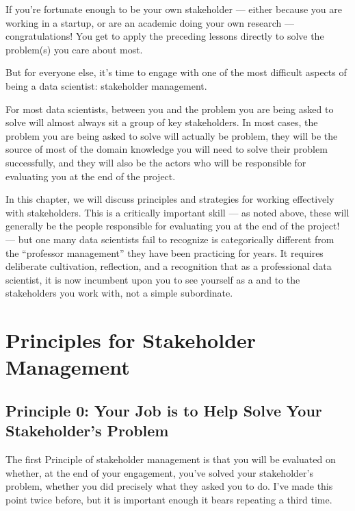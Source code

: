 \documentclass[letterpaper,10pt,english]{jupyterBook}
\begin{document}
\sphinxAtStartPar
If you’re fortunate enough to be your own stakeholder — either because you are working in a startup, or are an academic doing your own research — congratulations! You get to apply the preceding lessons directly to solve the problem(s) you care about most.

\sphinxAtStartPar
But for everyone else, it’s time to engage with one of the most difficult aspects of being a data scientist: stakeholder management.

\sphinxAtStartPar
For most data scientists, between you and the problem you are being asked to solve will almost always sit a group of key stakeholders. In most cases, the problem you are being asked to solve will actually be  problem, they will be the source of most of the domain knowledge you will need to solve their problem successfully, and they will also be the actors who will be responsible for evaluating you at the end of the project.

\sphinxAtStartPar
In this chapter, we will discuss principles and strategies for working effectively with stakeholders. This is a critically important skill — as noted above, these will generally be the people responsible for evaluating you at the end of the project! — but one many data scientists fail to recognize is categorically different from the “professor management” they have been practicing for years. It requires deliberate cultivation, reflection, and a recognition that as a professional data scientist, it is now incumbent upon you to see yourself as a  and  to the stakeholders you work with, not a simple subordinate.


\section{Principles for Stakeholder Management}
\label{\detokenize{20_problems_to_questions/20_stakeholder_management:principles-for-stakeholder-management}}

\subsection{Principle 0: Your Job is to Help Solve Your Stakeholder’s Problem}
\label{\detokenize{20_problems_to_questions/20_stakeholder_management:principle-0-your-job-is-to-help-solve-your-stakeholder-s-problem}}
\sphinxAtStartPar
The first Principle of stakeholder management is that you will be evaluated on whether, at the end of your engagement, you’ve solved your stakeholder’s problem,  whether you did precisely what they asked you to do. I’ve made this point twice before, but it is important enough it bears repeating a third time.
\end{document}
